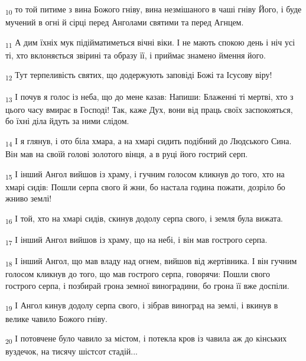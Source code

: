 \begin{tcolorbox}
\textsubscript{10} то той питиме з вина Божого гніву, вина незмішаного в чаші гніву Його, і буде мучений в огні й сірці перед Анголами святими та перед Агнцем.
\end{tcolorbox}
\begin{tcolorbox}
\textsubscript{11} А дим їхніх мук підійматиметься вічні віки. І не мають спокою день і ніч усі ті, хто вклоняється звірині та образу її, і приймає знамено ймення його.
\end{tcolorbox}
\begin{tcolorbox}
\textsubscript{12} Тут терпеливість святих, що додержують заповіді Божі та Ісусову віру!
\end{tcolorbox}
\begin{tcolorbox}
\textsubscript{13} І почув я голос із неба, що до мене казав: Напиши: Блаженні ті мертві, хто з цього часу вмирає в Господі! Так, каже Дух, вони від праць своїх заспокояться, бо їхні діла йдуть за ними слідом.
\end{tcolorbox}
\begin{tcolorbox}
\textsubscript{14} І я глянув, і ото біла хмара, а на хмарі сидить подібний до Людського Сина. Він мав на своїй голові золотого вінця, а в руці його гострий серп.
\end{tcolorbox}
\begin{tcolorbox}
\textsubscript{15} І інший Ангол вийшов із храму, і гучним голосом кликнув до того, хто на хмарі сидів: Пошли серпа свого й жни, бо настала година пожати, дозріло бо жниво землі!
\end{tcolorbox}
\begin{tcolorbox}
\textsubscript{16} І той, хто на хмарі сидів, скинув додолу серпа свого, і земля була вижата.
\end{tcolorbox}
\begin{tcolorbox}
\textsubscript{17} І інший Ангол вийшов із храму, що на небі, і він мав гострого серпа.
\end{tcolorbox}
\begin{tcolorbox}
\textsubscript{18} І інший Ангол, що мав владу над огнем, вийшов від жертівника. І він гучним голосом кликнув до того, що мав гострого серпа, говорячи: Пошли свого гострого серпа, і позбирай грона земної виноградини, бо грона її вже доспіли.
\end{tcolorbox}
\begin{tcolorbox}
\textsubscript{19} І Ангол кинув додолу серпа свого, і зібрав виноград на землі, і вкинув в велике чавило Божого гніву.
\end{tcolorbox}
\begin{tcolorbox}
\textsubscript{20} І потовчене було чавило за містом, і потекла кров із чавила аж до кінських вуздечок, на тисячу шістсот стадій...
\end{tcolorbox}
